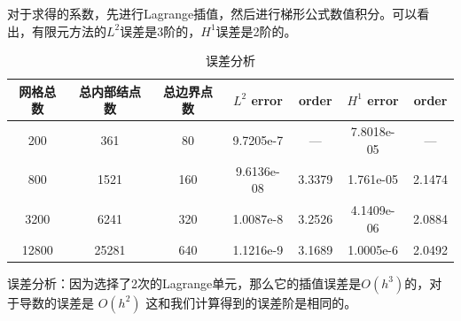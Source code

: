 \documentclass{ctexart}
\begin{document}
对于求得的系数，先进行Lagrange插值，然后进行梯形公式数值积分。可以看出，有限元方法的$L^2$误差是3阶的，$H^1$误差是2阶的。
\begin{table}[H]
  \caption{\label{table.label} 误差分析} \centering
  \bigskip
  \begin{small}
  \begin{tabular}{|c|c|c|cc|cc|}
    \hline
    网格总数 & 总内部结点数 & 总边界点数& $L^2 $ error & order &$ H^1$ error & order\\\hline
    200 & 361 & 80 & 9.7205e-7 & --- &  7.8018e-05 & --- \\
    800 & 1521 & 160 & 9.6136e-08 & 3.3379 & 1.761e-05 & 2.1474 \\
    3200 & 6241 & 320 & 1.0087e-8 & 3.2526 & 4.1409e-06 & 2.0884 \\
    12800& 25281 & 640 & 1.1216e-9 & 3.1689 & 1.0005e-6 & 2.0492 \\\hline
  \end{tabular}
  \end{small}
\end{table}

误差分析：因为选择了2次的Lagrange单元，那么它的插值误差是$O(h^3)$的，对于导数的误差是 $O(h^2)$ 这和我们计算得到的误差阶是相同的。
\end{document}
